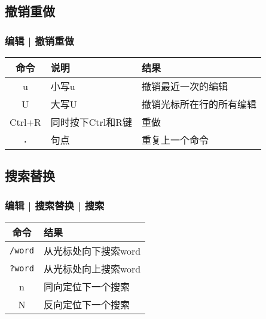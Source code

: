 \subsection{撤销重做}
\begin{frame}
  \frametitle{编辑 | \alert{撤销重做}}
  \begin{table}
    \centering
    \begin{tabularx}{0.8\textwidth}{clX}
      \hline
      \rowcolor{blue!50}命令 & 说明 & 结果\\
      \hline
      u & 小写u & 撤销最近一次的编辑\\
      U & 大写U & 撤销光标所在行的所有编辑\\
      Ctrl+R & 同时按下Ctrl和R键 & 重做\\
      \hline
      \verb|.| & 句点 & 重复上一个命令\\
      \hline
    \end{tabularx}
  \end{table}
\end{frame}

\subsection{搜索替换}
\begin{frame}[fragile]
  \frametitle{编辑 | 搜索替换 | \alert{搜索}}
  \begin{table}
    \centering
    \begin{tabularx}{0.6\textwidth}{cX}
      \hline
      \rowcolor{blue!50}命令 & 结果\\
      \hline
      \verb|/word| & 从光标处向下搜索word \\
      \verb|?word| & 从光标处向上搜索word\\
      n & 同向定位下一个搜索\\
      N & 反向定位下一个搜索\\
      \hline
    \end{tabularx}
  \end{table}
\end{frame}


